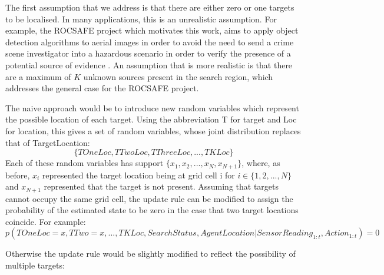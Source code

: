 The first assumption that we address is that there are either zero or one targets to be localised. In many applications, this is an unrealistic assumption. For example, the ROCSAFE project which motivates this work, aims to apply object detection algorithms to aerial images in order to avoid the need to send a crime scene investigator into a hazardous scenario in order to verify the presence of a potential source of evidence \cite{Bagherzadeh2017ROCSAFE:Incidents}. An assumption that is more realistic is that there are a maximum of $K$ unknown sources present in the search region, which addresses the general case for the ROCSAFE  project.\par

The naive approach would be to introduce new random variables which represent the possible location of each target. Using the abbreviation T for target and Loc for location, this gives a set of random variables, whose joint distribution replaces that of TargetLocation: \[\{TOneLoc, TTwoLoc, TThreeLoc,...,TKLoc\}\] Each of these random variables has support $\{x_1, x_2, ..., x_N, x_{N+1}\}$, where, as before, $x_i$ represented the target location being at grid cell i for $i \in \{1,2, ..., N\}$ and $x_{N+1}$ represented that the target is not present. 
Assuming that targets cannot occupy the same grid cell, the update rule can be modified to assign the probability of the estimated state to be zero in the case that two target locations coincide. For example:
\footnotesize{
\[p(TOneLoc = x, TTwo = x, ..., TKLoc, SearchStatus, AgentLocation | SensorReading_{1:t}, Action_{1:t}) = 0\]}

\normalsize
Otherwise the update rule would be slightly modified to reflect the possibility of multiple targets: 


\scriptsize

